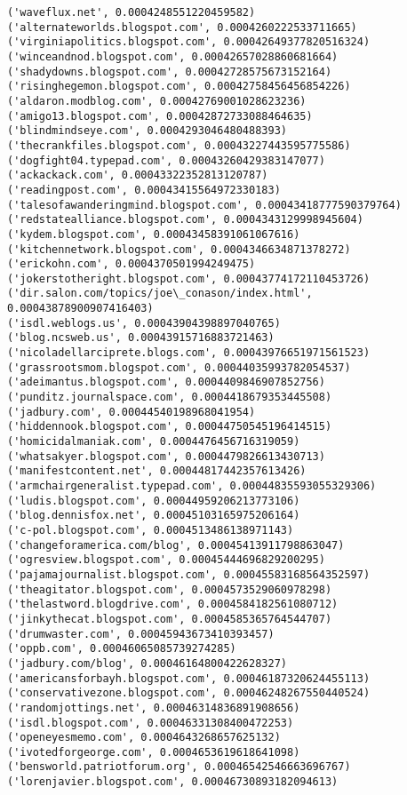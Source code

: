 \documentclass[11pt]{article}
\begin{document}
\begin{Verbatim}[commandchars=\\\{\}]
('waveflux.net', 0.0004248551220459582)
('alternateworlds.blogspot.com', 0.0004260222533711665)
('virginiapolitics.blogspot.com', 0.00042649377820516324)
('winceandnod.blogspot.com', 0.00042657028860681664)
('shadydowns.blogspot.com', 0.00042728575673152164)
('risinghegemon.blogspot.com', 0.00042758456456854226)
('aldaron.modblog.com', 0.00042769001028623236)
('amigo13.blogspot.com', 0.00042872733088464635)
('blindmindseye.com', 0.0004293046480488393)
('thecrankfiles.blogspot.com', 0.00043227443595775586)
('dogfight04.typepad.com', 0.00043260429383147077)
('ackackack.com', 0.00043322352813120787)
('readingpost.com', 0.00043415564972330183)
('talesofawanderingmind.blogspot.com', 0.00043418777590379764)
('redstatealliance.blogspot.com', 0.0004343129998945604)
('kydem.blogspot.com', 0.00043458391061067616)
('kitchennetwork.blogspot.com', 0.0004346634871378272)
('erickohn.com', 0.0004370501994249475)
('jokerstotheright.blogspot.com', 0.00043774172110453726)
('dir.salon.com/topics/joe\_conason/index.html', 0.00043878900907416403)
('isdl.weblogs.us', 0.00043904398897040765)
('blog.ncsweb.us', 0.00043915716883721463)
('nicoladellarciprete.blogs.com', 0.00043976651971561523)
('grassrootsmom.blogspot.com', 0.00044035993782054537)
('adeimantus.blogspot.com', 0.0004409846907852756)
('punditz.journalspace.com', 0.0004418679353445508)
('jadbury.com', 0.00044540198968041954)
('hiddennook.blogspot.com', 0.00044750545196414515)
('homicidalmaniak.com', 0.0004476456716319059)
('whatsakyer.blogspot.com', 0.0004479826613430713)
('manifestcontent.net', 0.00044817442357613426)
('armchairgeneralist.typepad.com', 0.00044835593055329306)
('ludis.blogspot.com', 0.00044959206213773106)
('blog.dennisfox.net', 0.00045103165975206164)
('c-pol.blogspot.com', 0.0004513486138971143)
('changeforamerica.com/blog', 0.00045413911798863047)
('ogresview.blogspot.com', 0.00045444696829200295)
('pajamajournalist.blogspot.com', 0.00045583168564352597)
('theagitator.blogspot.com', 0.0004573529060978298)
('thelastword.blogdrive.com', 0.0004584182561080712)
('jinkythecat.blogspot.com', 0.0004585365764544707)
('drumwaster.com', 0.00045943673410393457)
('oppb.com', 0.00046065085739274285)
('jadbury.com/blog', 0.00046164800422628327)
('americansforbayh.blogspot.com', 0.00046187320624455113)
('conservativezone.blogspot.com', 0.00046248267550440524)
('randomjottings.net', 0.00046314836891908656)
('isdl.blogspot.com', 0.00046331308400472253)
('openeyesmemo.com', 0.0004643268657625132)
('ivotedforgeorge.com', 0.0004653619618641098)
('bensworld.patriotforum.org', 0.00046542546663696767)
('lorenjavier.blogspot.com', 0.00046730893182094613)

\end{Verbatim}
\end{document}
